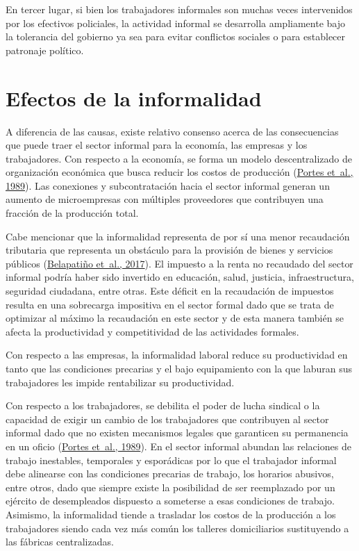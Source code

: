 \documentclass[
  letterpaper,
  12pt,
  oneside,
  spanish,
  doublespacing,
  headsepline,
  parskip]{MastersDoctoralThesis}
\begin{document}
En tercer lugar, si bien los trabajadores informales son muchas veces
intervenidos por los efectivos policiales, la actividad informal se
desarrolla ampliamente bajo la tolerancia del gobierno ya sea para
evitar conflictos sociales o para establecer patronaje político.

\hypertarget{efectos-de-la-informalidad}{%
\section{Efectos de la informalidad}\label{efectos-de-la-informalidad}}

A diferencia de las causas, existe relativo consenso acerca de las
consecuencias que puede traer el sector informal para la economía, las
empresas y los trabajadores. Con respecto a la economía, se forma un
modelo descentralizado de organización económica que busca reducir los
costos de producción (\protect\hyperlink{ref-theinfo1989}{Portes et~al.,
1989}). Las conexiones y subcontratación hacia el sector informal
generan un aumento de microempresas con múltiples proveedores que
contribuyen una fracción de la producción total.

Cabe mencionar que la informalidad representa de por sí una menor
recaudación tributaria que representa un obstáculo para la provisión de
bienes y servicios públicos
(\protect\hyperlink{ref-belapatiuxf1o2017}{Belapatiño et~al., 2017}). El
impuesto a la renta no recaudado del sector informal podría haber sido
invertido en educación, salud, justicia, infraestructura, seguridad
ciudadana, entre otras. Este déficit en la recaudación de impuestos
resulta en una sobrecarga impositiva en el sector formal dado que se
trata de optimizar al máximo la recaudación en este sector y de esta
manera también se afecta la productividad y competitividad de las
actividades formales.

Con respecto a las empresas, la informalidad laboral reduce su
productividad en tanto que las condiciones precarias y el bajo
equipamiento con la que laburan sus trabajadores les impide rentabilizar
su productividad.

Con respecto a los trabajadores, se debilita el poder de lucha sindical
o la capacidad de exigir un cambio de los trabajadores que contribuyen
al sector informal dado que no existen mecanismos legales que garanticen
su permanencia en un oficio (\protect\hyperlink{ref-theinfo1989}{Portes
et~al., 1989}). En el sector informal abundan las relaciones de trabajo
inestables, temporales y esporádicas por lo que el trabajador informal
debe alinearse con las condiciones precarias de trabajo, los horarios
abusivos, entre otros, dado que siempre existe la posibilidad de ser
reemplazado por un ejército de desempleados dispuesto a someterse a esas
condiciones de trabajo. Asimismo, la informalidad tiende a trasladar los
costos de la producción a los trabajadores siendo cada vez más común los
talleres domiciliarios sustituyendo a las fábricas centralizadas.
\end{document}
